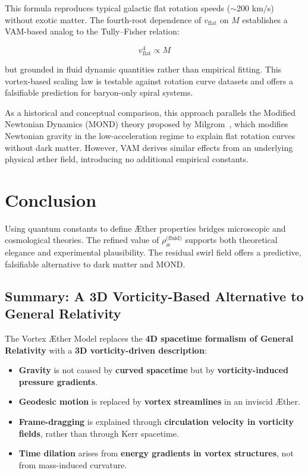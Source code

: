         This formula reproduces typical galactic flat rotation speeds ($\sim$200 km/s) without exotic matter. The fourth-root dependence of $v_{\text{flat}}$ on $M$ establishes a VAM-based analog to the Tully--Fisher relation:

        \[
            v_{\text{flat}}^4 \propto M
        \]

        but grounded in fluid dynamic quantities rather than empirical fitting. This vortex-based scaling law is testable against rotation curve datasets and offers a falsifiable prediction for baryon-only spiral systems.

        As a historical and conceptual comparison, this approach parallels the Modified Newtonian Dynamics (MOND) theory proposed by Milgrom~\cite{milgrom1983mond1, milgrom1983mond2}, which modifies Newtonian gravity in the low-acceleration regime to explain flat rotation curves without dark matter. However, VAM derives similar effects from an underlying physical æther field, introducing no additional empirical constants.

        \section*{Conclusion}

        Using quantum constants to define \AE{}ther properties bridges microscopic and cosmological theories. The refined value of $\rho_{\text{\ae}}^{\text{(fluid)}}$ supports both theoretical elegance and experimental plausibility. The residual swirl field offers a predictive, falsifiable alternative to dark matter and MOND.




        \subsection*{Summary: A 3D Vorticity-Based Alternative to General Relativity}

    The Vortex Æther Model replaces the \textbf{4D spacetime formalism of General Relativity} with a \textbf{3D vorticity-driven description}:

    \begin{itemize}
        \item \textbf{Gravity} is not caused by \textbf{curved spacetime} but by \textbf{vorticity-induced pressure gradients}.
        \item \textbf{Geodesic motion} is replaced by \textbf{vortex streamlines} in an inviscid Æther.
        \item \textbf{Frame-dragging} is explained through \textbf{circulation velocity in vorticity fields}, rather than through Kerr spacetime.
        \item \textbf{Time dilation} arises from \textbf{energy gradients in vortex structures}, not from mass-induced curvature.
    \end{itemize}


%
%
%
